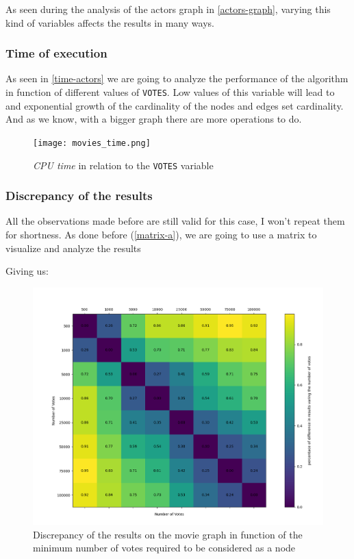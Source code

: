 As seen during the analysis of the actors graph in \ref{actors-graph}, varying this kind of variables affects the results in many ways.

\subsubsection{Time of execution}

As seen in \ref{time-actors} we are going to analyze the performance of the algorithm in function of different values of \texttt{VOTES}. Low values of this variable will lead to and exponential growth of the cardinality of the nodes and edges set cardinality. And as we know, with a bigger graph there are more operations to do.

\begin{figure}[h!]
    \centering
    \texttt{[image: movies\_time.png]}
    \caption{\emph{CPU time} in relation to the \texttt{VOTES} variable}
\end{figure}

\newpage


\subsubsection{Discrepancy of the results}

All the observations made before are still valid for this case, I won't repeat them for shortness. As done before (\ref{matrix-a}), we are going to use a matrix to visualize and analyze the results
\s

% 

\nd Giving us:
\begin{figure}[H] \label{matrix-b}
    \centering
    \includegraphics[width=13cm]{Figure_2.png}
    \caption{Discrepancy of the results on the movie graph in function of the minimum number of votes required to be considered as a node}
\end{figure}
\newpage


